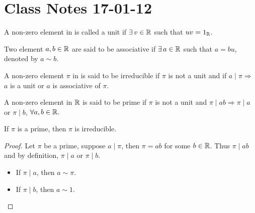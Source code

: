 \documentclass{mynotes}
\begin{document}
\section{Class Notes 17-01-12}\label{PIDUFD}
\begin{definition}
A non-zero element in \R{} is called a unit if $\exists\, v\in \mathbb{R}$ such that $uv=1_{\mathbb{R}}$.
\end{definition}
\begin{definition}
Two element $a,b \in\mathbb{R}$ are said to be associative if $\exists\, a\in\mathbb{R}$ such that $a=bu$, denoted by $a\sim b$.
\end{definition}
\begin{definition}
A non-zero element $\pi$ in \R{} is said to be irreducible if $\pi$ is not a unit and if $a\mid \pi\Rightarrow$ $a$ is a unit or $a$ is associative of $\pi$.
\end{definition}
\begin{definition}
A non-zero element in $\mathbb{R}$ is said to be prime if $\pi$ is not a unit and $\pi\mid  ab\Rightarrow \pi\mid a$ or $\pi\mid b$, $\forall a,b\in\mathbb{R}.$
\end{definition}
\begin{proposition}
If $\pi$ is a prime, then $\pi$ is irreducible.
\end{proposition}
\begin{proof}
Let $\pi$ be a prime, suppose $a\mid \pi$, then $\pi=ab$ for some $b\in\mathbb{R}$. Thus $\pi\mid ab$ and by definition, $\pi\mid a$ or $\pi\mid b$.
\begin{itemize}
\item If $\pi\mid a$, then $a\sim \pi$.
\item If $\pi\mid b$, then $a\sim 1$.
\end{itemize}
\end{proof}
\end{document}
